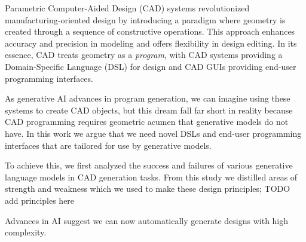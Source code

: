 

Parametric Computer-Aided Design (CAD) systems revolutionized manufacturing-oriented design by introducing a paradigm where geometry is created through a sequence of constructive operations. This approach enhances accuracy and precision in modeling and offers flexibility in design editing. In its essence, CAD treats geometry as a \textit{program}, with CAD systems providing a Domain-Specific Language (DSL) for design and CAD GUIs providing end-user programming interfaces. 


As generative AI advances in program generation, we can imagine using these systems to create CAD objects, but this dream fall far short in reality because CAD programming requires geometric acumen that generative models do not have. In this work we argue that we need novel DSLs and end-user programming interfaces that are tailored for use by generative models.  %


To achieve this, we first analyzed the success and failures of various generative language models in CAD generation tasks. From this study we distilled areas of strength and weakness which we used to make these design principles; TODO add principles here





%
% 
%
%
Advances in AI suggest we can now automatically generate designs with high complexity. 

